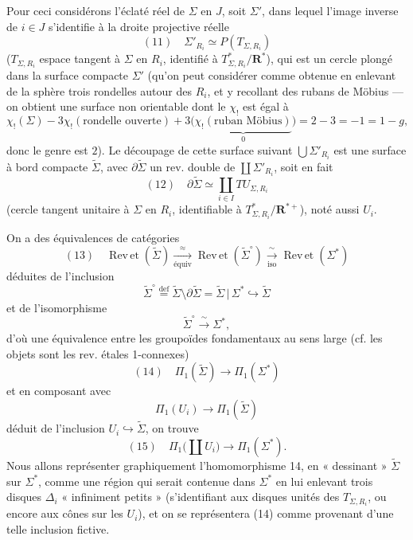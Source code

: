 \documentclass[11pt,a4paper]{article}
\begin{document}
Pour ceci considérons l'éclaté réel de $\Sigma$ en $J$, soit $\Sigma'$, dans lequel
l'image inverse de $i \in J$ s'identifie à  la droite projective réelle
\[
  (11)\quad \Sigma'_{R_i} \simeq P(T_{\Sigma,R_i})
\]
($T_{\Sigma,R_i}$ espace tangent à $\Sigma$ en $R_i$, identifié à $T^{*}_{\Sigma,R_i}/\mathbf{R}^{*}$),
qui est un cercle plongé dans la surface compacte $\Sigma'$ (qu'on peut considérer comme
obtenue en enlevant de la sphère trois rondelles autour des $R_i$, et y recollant des
rubans de Möbius — on obtient une surface non orientable dont le  $\chi_!$
est égal à
\[
  \chi_!(\Sigma) - 3\chi_!(\text{rondelle ouverte})
  + 3\big(\underbrace{\chi_!(\text{ruban Möbius})}_{0}\big)
  = 2 - 3 = -1 = 1 - g ,
\]
donc le genre est $2$). Le découpage de cette surface suivant $\bigcup \Sigma'_{R_i}$ est une
surface à bord compacte $\widetilde{\Sigma}$, avec $\partial\widetilde{\Sigma}$ un
rev. double de $\coprod \Sigma'_{R_i}$,  soit en fait
\[
  (12)\quad \partial\widetilde{\Sigma} \simeq \coprod_{i \in I} TU_{\Sigma,R_i}
\]
(cercle tangent unitaire à $\Sigma$ en $R_i$, identifiable à
$T^{*}_{\Sigma,R_i}/\mathbf{R}^{*+}$), noté aussi $U_i$.

On a des équivalences de catégories
\[
  (13)\quad
  \operatorname{Rev\,et}(\widetilde{\Sigma})
  \xrightarrow[\text{équiv}]{\ \approx\ }
  \operatorname{Rev\,et}(\widetilde{\Sigma}^{\circ})
  \xrightarrow[\text{iso}]{\ \sim\ }
  \operatorname{Rev\,et}(\Sigma^{*})
\]
déduites de l'inclusion
\[
  \widetilde{\Sigma}^{\circ}
  \overset{\mathrm{def}}{=} \widetilde{\Sigma} \setminus \partial\widetilde{\Sigma}
  = \widetilde{\Sigma} \,|\, \Sigma^{*} \hookrightarrow \widetilde{\Sigma}
\]
et de l'isomorphisme
\[
  \widetilde{\Sigma}^{\circ} \xrightarrow{\ \sim\ } \Sigma^{*},
\]
d'où une équivalence entre les groupoïdes fondamentaux au sens large (cf. les objets
sont les rev. étales 1-connexes)
\[
  (14)\quad \Pi_1(\widetilde{\Sigma}) \longrightarrow \Pi_1(\Sigma^{*})
\]
et en composant avec
\[
  \Pi_1(U_i) \longrightarrow \Pi_1(\widetilde{\Sigma})
\]
déduit de l'inclusion $U_i \hookrightarrow \widetilde{\Sigma}$, on trouve
\[
  (15)\quad \Pi_1\Big(\coprod U_i\Big) \longrightarrow \Pi_1(\Sigma^{*}) .
\]
Nous allons représenter graphiquement l'homomorphisme 14, en « dessinant »
$\widetilde{\Sigma}$ sur $\Sigma^{*}$, comme une région qui serait contenue dans
$\Sigma^{*}$ en lui enlevant  trois disques  $\Delta_i$
« infiniment petits » (s'identifiant aux disques unités des $T_{\Sigma,R_i}$, ou encore
aux cônes sur les $U_i$), et on se représentera (14) comme provenant d'une telle
inclusion fictive.
\end{document}
